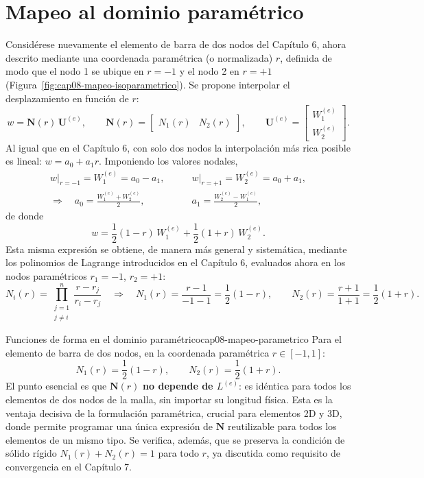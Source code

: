 \section{Mapeo al dominio paramétrico}

Considérese nuevamente el elemento de barra de dos nodos del Capítulo 6, ahora descrito mediante una coordenada paramétrica (o normalizada) $r$, definida de modo que el nodo 1 se ubique en $r=-1$ y el nodo 2 en $r=+1$ (Figura~\ref{fig:cap08-mapeo-isoparametrico}). Se propone interpolar el desplazamiento en función de $r$:
\[
w = \bm N(r)\,\bm U^{(e)}, \qquad \bm N(r) = \begin{bmatrix} N_1(r) & N_2(r) \end{bmatrix}, \qquad \bm U^{(e)} = \begin{bmatrix} W_1^{(e)} \\ W_2^{(e)} \end{bmatrix} .
\]
Al igual que en el Capítulo 6, con solo dos nodos la interpolación más rica posible es lineal: $w=a_0+a_1 r$. Imponiendo los valores nodales,
\begin{align*}
w\big|_{r=-1}=W_1^{(e)}=a_0-a_1, &\qquad w\big|_{r=+1}=W_2^{(e)}=a_0+a_1 , \\
\Longrightarrow \quad a_0=\frac{W_1^{(e)}+W_2^{(e)}}{2}, &\qquad a_1=\frac{W_2^{(e)}-W_1^{(e)}}{2} ,
\end{align*}
de donde
\[
w = \frac{1}{2}(1-r)\,W_1^{(e)} + \frac{1}{2}(1+r)\,W_2^{(e)} .
\]
Esta misma expresión se obtiene, de manera más general y sistemática, mediante los polinomios de Lagrange introducidos en el Capítulo 6, evaluados ahora en los nodos paramétricos $r_1=-1$, $r_2=+1$:
\[
N_i(r) = \prod_{\substack{j=1\\j\neq i}}^n \frac{r-r_j}{r_i-r_j} \quad\Longrightarrow\quad N_1(r)=\frac{r-1}{-1-1}=\frac{1}{2}(1-r), \qquad N_2(r)=\frac{r+1}{1+1}=\frac{1}{2}(1+r) .
\]

\begin{ecnimportante}{Funciones de forma en el dominio paramétrico}{cap08-mapeo-parametrico}
Para el elemento de barra de dos nodos, en la coordenada paramétrica $r\in[-1,1]$:
\[
N_1(r) = \frac{1}{2}(1-r), \qquad N_2(r) = \frac{1}{2}(1+r) .
\]
El punto esencial es que $\bm N(r)$ \textbf{no depende de $L^{(e)}$}: es idéntica para todos los elementos de dos nodos de la malla, sin importar su longitud física. Esta es la ventaja decisiva de la formulación paramétrica, crucial para elementos 2D y 3D, donde permite programar una única expresión de $\bm N$ reutilizable para todos los elementos de un mismo tipo. Se verifica, además, que se preserva la condición de sólido rígido $N_1(r)+N_2(r)=1$ para todo $r$, ya discutida como requisito de convergencia en el Capítulo 7.
\end{ecnimportante}


